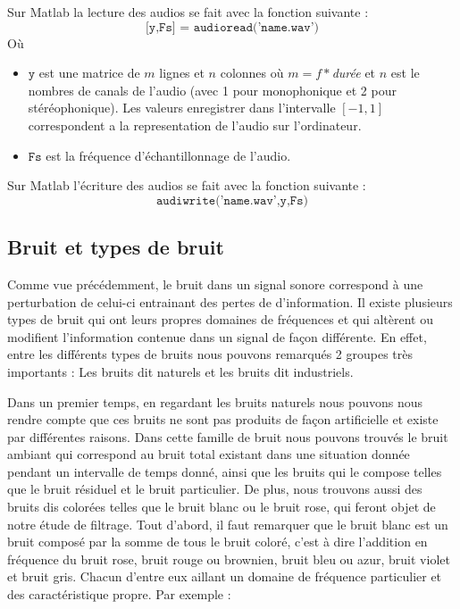 \documentclass[conference,onecolumn]{IEEEtran}
\begin{document}
Sur Matlab la lecture des audios se fait avec la fonction suivante :
\[\texttt{[y,Fs] = audioread('name.wav')}\]
Où
\begin{itemize}
    \item[] $\texttt{y}$ est une matrice de $m$ lignes et $n$ colonnes où $m=f*$\textit{durée} et $n$ est le nombres de canals de l’audio (avec 1 pour monophonique et 2 pour stéréophonique). Les valeurs enregistrer dans l’intervalle $[-1,1]$ correspondent a la representation de l’audio sur l’ordinateur. 
    \item[] $\texttt{Fs}$  est la fréquence d’échantillonnage de l’audio.
\end{itemize}
Sur Matlab l’écriture des audios se fait avec la fonction suivante :
\[\texttt{audiwrite('name.wav',y,Fs)}\]

\subsection{Bruit et types de bruit}
Comme vue précédemment, le bruit dans un signal sonore correspond à une perturbation de celui-ci entrainant des pertes de d’information. Il existe plusieurs types de bruit qui ont leurs propres domaines de fréquences et qui altèrent ou modifient l’information contenue dans un signal de façon différente. En effet, entre les différents types de bruits nous pouvons remarqués 2 groupes très importants : Les bruits dit naturels et les bruits dit industriels.  

Dans un premier temps, en regardant les bruits naturels nous pouvons nous rendre compte que ces bruits ne sont pas produits de façon artificielle et existe par différentes raisons. Dans cette famille de bruit nous pouvons trouvés le bruit ambiant qui correspond au bruit total existant dans une situation donnée pendant un intervalle de temps donné, ainsi que les bruits qui le compose telles que le bruit résiduel et le bruit particulier. De plus, nous trouvons aussi des bruits dis colorées telles que le bruit blanc ou le bruit rose, qui feront objet de notre étude de filtrage. Tout d’abord, il faut remarquer que le bruit blanc est un bruit composé par la somme de tous le bruit coloré, c’est à dire l’addition en fréquence du bruit rose, bruit rouge ou brownien, bruit bleu ou azur, bruit violet et bruit gris. Chacun d’entre eux aillant un domaine de fréquence particulier et des caractéristique propre. Par exemple :\\
\end{document}
